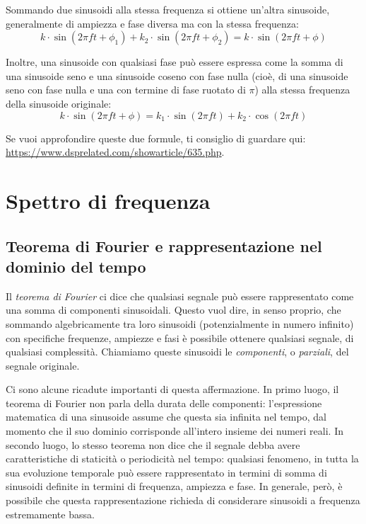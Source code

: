\documentclass[11pt]{report}
\begin{document}
Sommando due sinusoidi alla stessa frequenza si ottiene un'altra sinusoide, generalmente di ampiezza e fase diversa ma con la stessa frequenza:
\begin{equation}
k \cdot \sin(2 \pi f t + \phi_1) +  k_2 \cdot \sin(2 \pi f t + \phi_2) = k \cdot \sin(2 \pi f t + \phi)
\end{equation}

Inoltre, una sinusoide con qualsiasi fase può essere espressa come la somma di una sinusoide seno e una sinusoide coseno con fase nulla (cioè, di una sinusoide seno con fase nulla e una con termine di fase ruotato di $\pi$) alla stessa frequenza della sinusoide originale:
\begin{equation}
k \cdot \sin(2 \pi f t + \phi) = k_1 \cdot \sin(2 \pi f t) + k_2 \cdot \cos(2 \pi f t)
\end{equation}

Se vuoi approfondire queste due formule, ti consiglio di guardare qui: \url{https://www.dsprelated.com/showarticle/635.php}.




\section{Spettro di frequenza}

\subsection{Teorema di Fourier e rappresentazione nel dominio del tempo}

Il \emph{teorema di Fourier} ci dice che qualsiasi segnale può essere rappresentato come una somma di componenti sinusoidali. Questo vuol dire, in senso proprio, che sommando algebricamente tra loro sinusoidi (potenzialmente in numero infinito) con specifiche frequenze, ampiezze e fasi è possibile ottenere qualsiasi segnale, di qualsiasi complessità. Chiamiamo queste sinusoidi le \emph{componenti}, o \emph{parziali}, del segnale originale.

Ci sono alcune ricadute importanti di questa affermazione. In primo luogo, il teorema di Fourier non parla della durata delle componenti: l'espressione matematica di una sinusoide assume che questa sia infinita nel tempo, dal momento che il suo dominio corrisponde all'intero insieme dei numeri reali. In secondo luogo, lo stesso teorema non dice che il segnale debba avere caratteristiche di staticità o periodicità nel tempo: qualsiasi fenomeno, in tutta la sua evoluzione temporale può essere rappresentato in termini di somma di sinusoidi definite in termini di frequenza, ampiezza e fase. In generale, però, è possibile che questa rappresentazione richieda di considerare sinusoidi a frequenza estremamente bassa.
\end{document}
